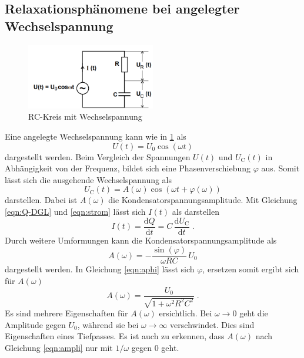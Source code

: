 \subsection{Relaxationsphänomene bei angelegter Wechselspannung}
\begin{figure}
    \centering
    \caption{RC-Kreis mit Wechselspannung} 
    \label{fig:Wechs}
    \includegraphics[width = 0.5\textwidth]{pics/wechselspannung-RC.png}
\end{figure}
\noindent Eine angelegte Wechselspannung kann wie in \ref{fig:Wechs} als 
\begin{equation*}
    U(t)=U_0 \cos(\omega t)
\end{equation*}
dargestellt werden. Beim Vergleich der Spannungen $U(t)$ und $U_\text{C}(t)$ in Abhängigkeit von der Frequenz, bildet sich eine Phasenverschiebung $\varphi$ aus.
Somit lässt sich die ausgehende Wechselspannung als
\begin{equation}
    U_\text{C}(t)= A(\omega) \cos (\omega t + \varphi (\omega))
\end{equation}
darstellen. Dabei ist $A(\omega)$ die Kondensatorspannungsamplitude.
Mit Gleichung \eqref{eqn:Q-DGL} und \eqref{eqn:strom} lässt sich $I(t)$ als darstellen
\begin{equation}
    \label{eqn:strom}
    I(t)= \frac{\text{d}Q}{\text{d}t}=C\, \frac{\text{d}U_\text{C}}{\text{d}t}\; \text{.}
\end{equation}
Durch weitere Umformungen kann die Kondensatorspannungsamplitude als
\begin{equation}
    \label{eqn:aphi}
    A(\omega)=-\frac{\sin (\varphi)}{\omega RC}\, U_0 
\end{equation}
dargestellt werden.
In Gleichung \eqref{eqn:aphi} lässt sich $\varphi$, ersetzen somit ergibt sich für $A(\omega)$
\begin{equation}
    \label{eqn:ampli}
    A(\omega)=\frac{U_0}{\sqrt{1+\omega^2 R^2 C^2}} \; \text{.}
\end{equation}
Es sind mehrere Eigenschaften für $A(\omega)$ ersichtlich. Bei $\omega \rightarrow 0$ geht die Amplitude gegen $U_0$, während sie bei 
$\omega \rightarrow \infty$ verschwindet. Dies sind Eigenschaften eines Tiefpasses. Es ist auch zu erkennen, dass $A(\omega)$ nach Gleichung \eqref{eqn:ampli}
nur mit $1/\omega$ gegen $0$ geht.
